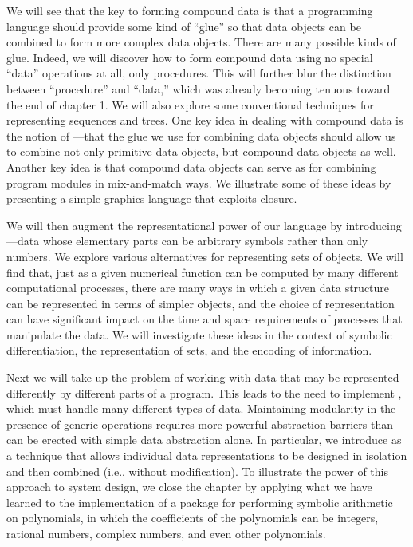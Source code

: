 We will see that the key to forming compound data is that a programming
language should provide some kind of ``glue'' so that data objects can be
combined to form more complex data objects.  There are many possible kinds of
glue.  Indeed, we will discover how to form compound data using no special
``data'' operations at all, only procedures.  This will further blur the
distinction between ``procedure'' and ``data,'' which was already becoming
tenuous toward the end of chapter 1.  We will also explore some
conventional techniques for representing sequences and trees.  One key idea in
dealing with compound data is the notion of ---that the glue
we use for combining data objects should allow us to combine not only primitive
data objects, but compound data objects as well.  Another key idea is that
compound data objects can serve as  for
combining program modules in mix-and-match ways.  We illustrate some of these
ideas by presenting a simple graphics language that exploits closure.

We will then augment the representational power of our language by introducing
---data whose elementary parts can be arbitrary
symbols rather than only numbers.  We explore various alternatives for
representing sets of objects.  We will find that, just as a given numerical
function can be computed by many different computational processes, there are
many ways in which a given data structure can be represented in terms of
simpler objects, and the choice of representation can have significant impact
on the time and space requirements of processes that manipulate the data.  We
will investigate these ideas in the context of symbolic differentiation, the
representation of sets, and the encoding of information.

Next we will take up the problem of working with data that may be represented
differently by different parts of a program.  This leads to the need to
implement , which must handle many different types
of data.  Maintaining modularity in the presence of generic operations requires
more powerful abstraction barriers than can be erected with simple data
abstraction alone.  In particular, we introduce  as a technique that allows individual data representations to be
designed in isolation and then combined  (i.e., without
modification).  To illustrate the power of this approach to system design, we
close the chapter by applying what we have learned to the implementation of a
package for performing symbolic arithmetic on polynomials, in which the
coefficients of the polynomials can be integers, rational numbers, complex
numbers, and even other polynomials.



